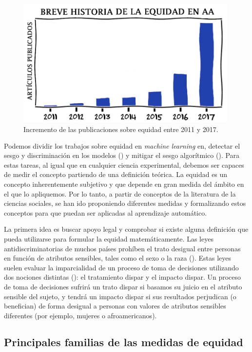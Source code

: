 \documentclass[oneside,openright,titlepage,numbers=noenddot,openany,headinclude,footinclude=true,
cleardoublepage=empty,abstractoff,BCOR=5mm,paper=a4,fontsize=12pt,main=spanish]{scrreprt}
\begin{document}
\begin{figure}[h]
	\centering
	\includegraphics[width=11.05cm]{exponencial.png}
	\caption{Incremento de las publicaciones sobre equidad entre 2011 y 2017.}
\end{figure}

\clearpage

Podemos dividir los trabajos sobre equidad en \textit{machine learning} en, detectar el sesgo y discriminación en los modelos (\cite{detect2012}) y mitigar el sesgo algorítmico (\cite{mitigate2017}). Para estas tareas, al igual que en cualquier ciencia experimental, debemos ser capaces de medir el concepto partiendo de una definición teórica. La equidad es un concepto inherentemente subjetivo y que depende en gran medida del ámbito en el que lo apliquemos. Por lo tanto, a partir de conceptos de la literatura de la ciencias sociales, se han ido proponiendo diferentes medidas y formalizando estos conceptos para que puedan ser aplicadas al aprendizaje automático.

La primera idea es buscar apoyo legal y comprobar si existe alguna definición que pueda utilizarse para formular la equidad matemáticamente. Las leyes antidiscriminatorias de muchos países prohíben el trato desigual entre personas en función de atributos sensibles, tales como el sexo o la raza (\cite{ley1964}). Estas leyes suelen evaluar la imparcialidad de un proceso de toma de decisiones utilizando dos nociones distintas (\cite{bigdata2016}): el tratamiento dispar y el impacto dispar. Un proceso de toma de decisiones sufrirá un trato dispar si basamos su juicio en el atributo sensible del sujeto, y tendrá un impacto dispar si sus resultados perjudican (o benefician) de forma desigual a personas con valores de atributos sensibles diferentes (por ejemplo, mujeres o afroamericanos).

\subsection{Principales familias de las medidas de equidad}
\end{document}
